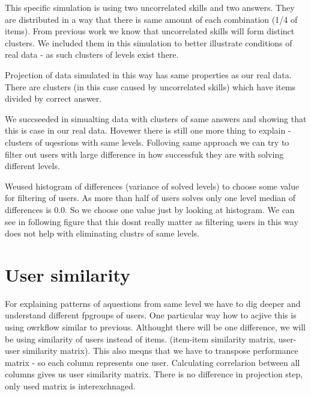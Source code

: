\documentclass[
  digital, %
  table,   %
  nolof,     %
  nolot,     %
  nocover
]{fithesis3}
\begin{document}
This specific simulation is using two uncorrelated skills and two answers. They are distributed in a way that there is same amount of each combination (1/4 of items). From previous work we know that uncorrelated skills will form distinct clusters. We included them in this simulation to better illustrate conditions of real data - as such clusters of levels exist there.

Projection of data simulated in this way has same properties as our real data. There are clusters (in this case caused by uncorrelated skills) which have items divided by correct answer.


We succseeded in simualting data with clusters of same answers and
showing that this is case in our real data. Hovewer there is still one
more thing to explain - clusters of uqesrions with same levels.
Folloving same approach we can try to filter out users with large
difference in how successfuk they are with solving different levels.

Weused histogram of differences (variance of solved levels) to choose
some value for filtering of users. As more than half of users solves
only one level median of differences is 0.0. So we choose one value just
by looking at histogram. We can see in following figure that this dosnt
really matter as filtering users in this way does not help with
eliminating clustrs of same levels.



\section{User similarity}\label{user-similarity}


For explaining patterns of aquestions from same level we have to dig
deeper and understand different fpgroups of users. One particular way
how to acjive this is using owrkflow similar to previous. Althought
there will be one difference, we will be using similarity of users
instead of items. (item-item similarity matrix, user-user similarity
matrix). This also meqns that we have to transpose performance matrix -
so each column represents one user. Calculating correlarion between all
columns gives us user similarity matrix. There is no difference in
projection step, only used matrix is interexchnaged.
\end{document}
